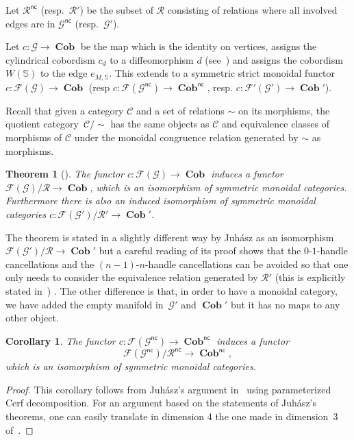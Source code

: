 \documentclass[10pt,a4paper]{amsart}
\newtheorem{theorem}{Theorem}
\newtheorem{corollary}{Corollary}
\numberwithin{equation}{section}
\numberwithin{theorem}{section}
\numberwithin{proposition}{section}
\numberwithin{definition}{section}
\numberwithin{lemma}{section}
\numberwithin{corollary}{section}
\numberwithin{remark}{section}
\numberwithin{example}{section}
\newcommand{\cat}{\mathcal{C}}
\newcommand{\cob}{\operatorname{\textbf{Cob}}}
\newcommand{\nc}[1]{{#1^{\mathsf{nc}}}}
\newcommand{\Sp}{\mathbb{S}}
\begin{document}
Let $\nc{\mathcal{R}}$ (resp.\ $\mathcal{R'}$) be the subset of
$\mathcal{R}$ consisting of relations where all involved edges are in
$\nc {\mathcal{G}}$ (resp.~$\mathcal{G'}$).
\begin{definition}
 Let $c\colon \mathcal{G}\to \cob$ be the map which is the identity on
 vertices, assigns the cylindrical cobordism $c_d$ to a
 diffeomorphism $d$ (see~\cite[Definition~2.3]{Juh2018}) and
 assigns the cobordism $W(\Sp)$ to the edge $ e_{M, \Sp}$. This
 extends to a symmetric strict monoidal functor
 $c\colon \mathcal{F}(\mathcal{G})\to \cob$ (resp
 $c\colon \mathcal{F}(\nc{\mathcal{G}})\to \nc{\cob}$,
 resp. $c\colon \mathcal{F'}({\mathcal{G'}})\to {\cob'}$).
\end{definition}

Recall that given a category $\cat$ and a set of relations $\sim$ on
its morphisms, the quotient category~$\cat/{\sim}$ has the same objects
as $\cat$ and
equivalence classes of morphisms of $\cat$
under the monoidal congruence relation generated by $\sim$
as morphisms.
\begin{theorem}[{\cite[Theorem~1.7]{Juh2018}}]
The functor $c\colon \mathcal{F}(\mathcal{G})\to \cob$ induces a functor
$\mathcal{F}(\mathcal{G})/\mathcal{R}\to \cob$,
which is an isomorphism of symmetric monoidal categories.
Furthermore there is also an induced isomorphism of symmetric monoidal categories
$c\colon \mathcal{F}(\mathcal{G'})/\mathcal{R'}\to \cob'$.
\end{theorem}

\begin{remark}
 The theorem is stated in a slightly different way by Juh\'asz as an
 isomorphism $\mathcal{F}(\mathcal{G'})/\mathcal{R}\to \cob'$ but a careful
 reading of its proof shows that the $0$-$1$-handle cancellations
 and the $(n-1)$-$n$-handle cancellations can be avoided so that one
 only needs to consider the equivalence relation generated by
 $\mathcal R'$ (this is explicitly stated in~\cite[Theorem~2.24]{Juh2018}) . The
 other difference is that, in order to have a monoidal category, we have added
 the empty manifold in~$\mathcal{G'}$ and $\cob'$ but it has no maps
 to any other object.
\end{remark}

\begin{corollary}
 The functor $c\colon \mathcal{F}(\nc{\mathcal{G}})\to \nc{\cob}$ induces
 a functor
 \[
 \mathcal{F}(\nc{\mathcal{G}})/\nc{\mathcal{R}}\to \nc\cob,
 \]
 which is an isomorphism of symmetric monoidal categories.
\end{corollary}
\begin{proof}
 This corollary follows from Juh\'asz's argument in~\cite{Juh2018}
 using parameterized Cerf decomposition. For an argument based on
 the statements of Juh\'asz's theorems, one can easily translate in
 dimension 4 the one made in dimension~3 of~\cite[Corollary~4.3]{CGPV2023a}.
\end{proof}
\end{document}
